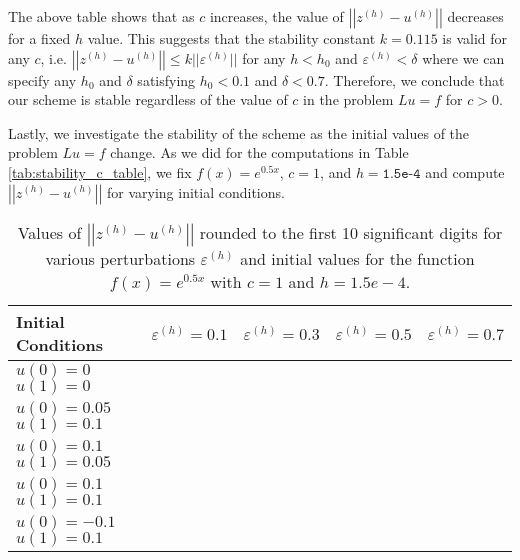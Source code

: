 The above table shows that as $c$ increases, the value of
$\left|\left|z^{(h)} - u^{(h)}\right|\right|$ decreases for a fixed $h$ value. This
suggests that the stability constant $k = 0.115$ is valid for any $c$, i.e.
$\left|\left|z^{(h)} - u^{(h)}\right|\right| \leq k ||\varepsilon ^{(h)}||$ for
any $h < h_0$ and $\varepsilon^{(h)} < \delta$ where we can specify any $h_0$ and
$\delta$ satisfying $h_0 < 0.1$ and $\delta < 0.7$. Therefore, we conclude that
our scheme is stable regardless of the value of $c$ in the problem $Lu = f$ for $c > 0$.

Lastly, we investigate the stability of the scheme as the initial values of the
problem $Lu = f$ change. As we did for the computations in Table \ref{tab:stability_c_table},
we fix $f(x) = e^{0.5x}$, $c=1$, and $h=\texttt{1.5e-4}$ and compute $\left|\left|z^{(h)} - u^{(h)}\right|\right|$
for varying initial conditions.

\begin{table}[h!]
  \centering
  \bgroup
  \def\arraystretch{1.5}
  \begin{tabular}{| l | c | c | c | c |}
    \hline
    \shortstack[l]{Initial \\ Conditions} & $\varepsilon^{(h)} = 0.1$ & $\varepsilon^{(h)} = 0.3$ & $\varepsilon^{(h)} = 0.5$ & $\varepsilon^{(h)} = 0.7$ \\
    \hline
    \shortstack[l]{$u(0) = 0$ \\ $u(1) = 0$} & & & & \\
    \hline
    \shortstack[l]{$u(0) = 0.05$ \\ $u(1) = 0.1$} & & & & \\
    \hline
    \shortstack[l]{$u(0) = 0.1$ \\ $u(1) = 0.05$} & & & & \\
    \hline
    \shortstack[l]{$u(0) = 0.1$ \\ $u(1) = 0.1$} & & & & \\
    \hline
    \shortstack[l]{$u(0) = -0.1$ \\ $u(1) = 0.1$} & & & & \\
    \hline
  \end{tabular}
  \egroup
  \caption{Values of $\left|\left|z^{(h)} - u^{(h)}\right|\right|$ rounded to the first 10
    significant digits for various
    perturbations $\varepsilon^{(h)}$ and initial values for the function
    $f(x) = e^{0.5x}$ with $c=1$ and $h=1.5e-4$.}
\end{table}

